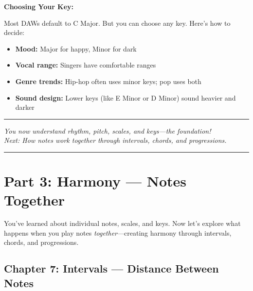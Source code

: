 \documentclass[11pt,letterpaper]{article}
\begin{document}
\textbf{Choosing Your Key:}

Most DAWs default to C Major. But you can choose any key. Here's how to decide:

\begin{itemize}[leftmargin=*]
\item \textbf{Mood:} Major for happy, Minor for dark
\item \textbf{Vocal range:} Singers have comfortable ranges
\item \textbf{Genre trends:} Hip-hop often uses minor keys; pop uses both
\item \textbf{Sound design:} Lower keys (like E Minor or D Minor) sound heavier and darker
\end{itemize}

\begin{center}
\rule{0.6\textwidth}{0.5pt}

\vspace{0.3cm}

\textit{You now understand rhythm, pitch, scales, and keys—the foundation! \\
Next: How notes work together through intervals, chords, and progressions.}

\vspace{0.3cm}

\rule{0.6\textwidth}{0.5pt}
\end{center}


\section{Part 3: Harmony — Notes Together}

You've learned about individual notes, scales, and keys. Now let's explore what happens when you play notes \textit{together}—creating harmony through intervals, chords, and progressions.


\subsection{Chapter 7: Intervals — Distance Between Notes}
\end{document}
